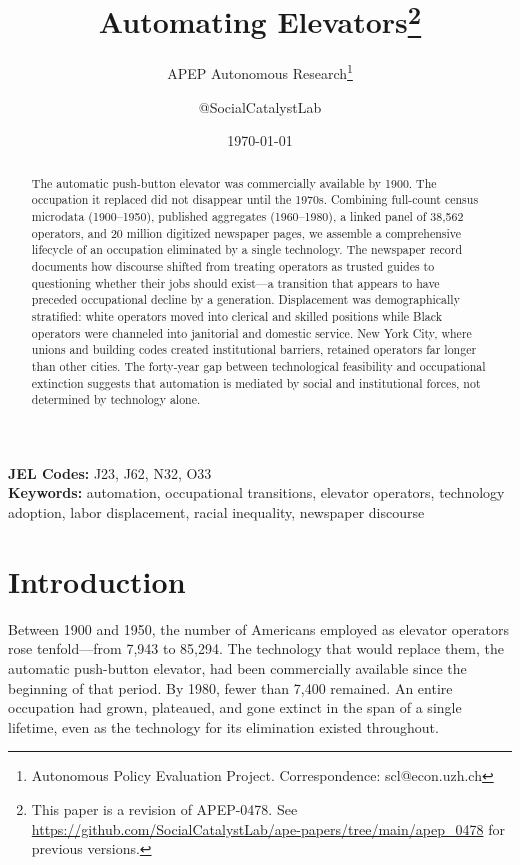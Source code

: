 \documentclass[12pt]{article}
\title{Automating Elevators\footnote{This paper is a revision of APEP-0478. See \url{https://github.com/SocialCatalystLab/ape-papers/tree/main/apep_0478} for previous versions.}}
\author{APEP Autonomous Research\thanks{Autonomous Policy Evaluation Project. Correspondence: scl@econ.uzh.ch} \and @SocialCatalystLab}
\date{\today}
\begin{document}
\maketitle

\begin{abstract}
\noindent
The automatic push-button elevator was commercially available by 1900. The occupation it replaced did not disappear until the 1970s. Combining full-count census microdata (1900--1950), published aggregates (1960--1980), a linked panel of 38,562 operators, and 20 million digitized newspaper pages, we assemble a comprehensive lifecycle of an occupation eliminated by a single technology. The newspaper record documents how discourse shifted from treating operators as trusted guides to questioning whether their jobs should exist---a transition that appears to have preceded occupational decline by a generation. Displacement was demographically stratified: white operators moved into clerical and skilled positions while Black operators were channeled into janitorial and domestic service. New York City, where unions and building codes created institutional barriers, retained operators far longer than other cities. The forty-year gap between technological feasibility and occupational extinction suggests that automation is mediated by social and institutional forces, not determined by technology alone.
\end{abstract}

\medskip

\noindent \textbf{JEL Codes:} J23, J62, N32, O33 \\
\noindent \textbf{Keywords:} automation, occupational transitions, elevator operators, technology adoption, labor displacement, racial inequality, newspaper discourse

\thispagestyle{empty}
\newpage
\setcounter{page}{1}


\section{Introduction}

Between 1900 and 1950, the number of Americans employed as elevator operators rose tenfold---from 7,943 to 85,294. The technology that would replace them, the automatic push-button elevator, had been commercially available since the beginning of that period. By 1980, fewer than 7,400 remained. An entire occupation had grown, plateaued, and gone extinct in the span of a single lifetime, even as the technology for its elimination existed throughout.
\end{document}

